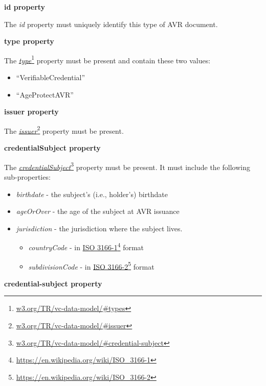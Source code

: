 \documentclass[11pt, oneside]{article}   	%
\newcommand{\hyperfootnote}[1][]{\def\ArgI{{#1}}\hyperfootnoteRelay}
\newcommand\hyperfootnoteRelay[2][]{\href{#1#2}{\ArgI}\footnote{\href{#1#2}{#2}}}
\begin{document}
\textbf{id property}

The \emph{id} property must uniquely identify this type of AVR document. 
	
\textbf{type property}

The \hyperfootnote[\emph{type}][https://]{w3.org/TR/vc-data-model/\#types} property must be present and contain these two values:
\begin{itemize}
	\item ``VerifiableCredential''
	\item ``AgeProtectAVR''
\end{itemize}

\textbf{issuer property}

The \hyperfootnote[\emph{issuer}][https://]{w3.org/TR/vc-data-model/\#issuer} property must be present.

\textbf{credentialSubject property}

The \hyperfootnote[\emph{credentialSubject}][https://]{w3.org/TR/vc-data-model/\#credential-subject} property must be present. It must include the following sub-properties:
\begin{itemize}
	\item \emph{birthdate} - the subject's (i.e., holder's) birthdate
	\item \emph{ageOrOver} - the age of the subject at AVR issuance
	\item \emph{jurisdiction} - the jurisdiction where the subject lives. 
	\begin{itemize}
		\item \emph{countryCode} - in \hyperfootnote[ISO 3166-1]["https://"]{https://en.wikipedia.org/wiki/ISO\_3166-1} format
		\item \emph{subdivisionCode} - in \hyperfootnote[ISO 3166-2][https://]{https://en.wikipedia.org/wiki/ISO\_3166-2} format
	\end{itemize}
\end{itemize}

\textbf{credential-subject property}
\end{document}
